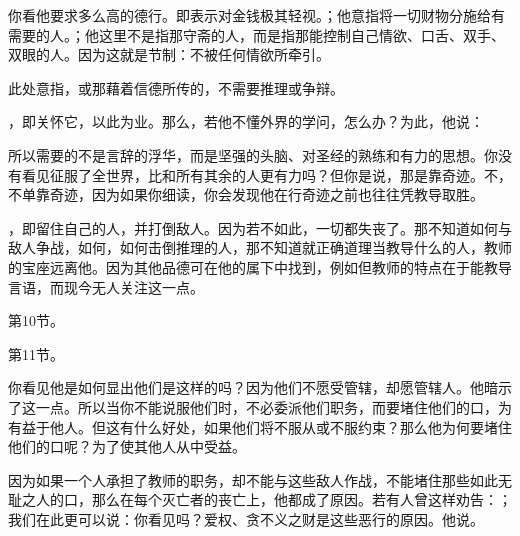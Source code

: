 你看他要求多么高的德行。即表示对金钱极其轻视。；他意指将一切财物分施给有需要的人。；他这里不是指那守斋的人，而是指那能控制自己情欲、口舌、双手、双眼的人。因为这就是节制：不被任何情欲所牵引。\par

此处意指，或那藉着信德所传的，不需要推理或争辩。\par

，即关怀它，以此为业。那么，若他不懂外界的学问，怎么办？为此，他说：\par

\par

所以需要的不是言辞的浮华，而是坚强的头脑、对圣经的熟练和有力的思想。你没有看见征服了全世界，比和所有其余的人更有力吗？但你是说，那是靠奇迹。不，不单靠奇迹，因为如果你细读，你会发现他在行奇迹之前也往往凭教导取胜。\par

，即留住自己的人，并打倒敌人。因为若不如此，一切都失丧了。那不知道如何与敌人争战，如何，如何击倒推理的人，那不知道就正确道理当教导什么的人，教师的宝座远离他。因为其他品德可在他的属下中找到，例如但教师的特点在于能教导言语，而现今无人关注这一点。\par

第10节。\par

第11节。\par

你看见他是如何显出他们是这样的吗？因为他们不愿受管辖，却愿管辖人。他暗示了这一点。所以当你不能说服他们时，不必委派他们职务，而要堵住他们的口，为有益于他人。但这有什么好处，如果他们将不服从或不服约束？那么他为何要堵住他们的口呢？为了使其他人从中受益。\par

\par

因为如果一个人承担了教师的职务，却不能与这些敌人作战，不能堵住那些如此无耻之人的口，那么在每个灭亡者的丧亡上，他都成了原因。若有人曾这样劝告：；我们在此更可以说：你看见吗？爱权、贪不义之财是这些恶行的原因。他说。\par

